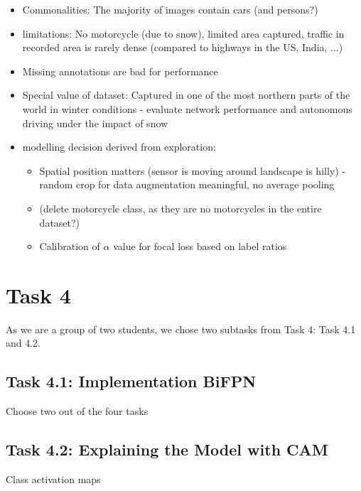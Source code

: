 \documentclass{article}
\begin{document}
\begin{itemize}
    \item Commonalities: The majority of images contain cars (and persons?)
    \item limitations: No motorcycle (due to snow), limited area captured, traffic in recorded area is rarely dense (compared to highways in the US, India, ...)
    \item Missing annotations are bad for performance
    \item Special value of dataset: Captured in one of the most northern parts of the world in winter conditions - evaluate network performance and autonomous driving under the impact of snow
    \item modelling decision derived from exploration:
        \begin{itemize}
            \item Spatial position matters (sensor is moving around landscape is hilly) - random crop for data augmentation meaningful, no average pooling
            \item (delete motorcycle class, as they are no motorcycles in the entire dataset?)
            \item Calibration of $\alpha$ value for focal loss based on label ratios
        \end{itemize}
\end{itemize}

\section*{Task 4}

As we are a group of two students, we chose two subtasks from Task 4: Task 4.1 and 4.2.

\subsection*{Task 4.1: Implementation BiFPN}
Choose two out of the four tasks

\subsection*{Task 4.2: Explaining the Model with CAM}
Class activation maps




\end{document}
